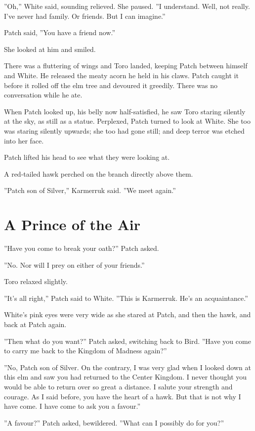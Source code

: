 \documentclass[12pt]{book}
\begin{document}
''Oh,'' White said, sounding relieved. She paused. ''I understand. Well, not really. I've never had family. Or friends. But I can imagine.''

Patch said, ''You have a friend now.''

She looked at him and smiled.

There was a fluttering of wings and Toro landed, keeping Patch between himself and White. He released the meaty acorn he held in his claws. Patch caught it before it rolled off the elm tree and devoured it greedily. There was no conversation while he ate.

When Patch looked up, his belly now half-satisfied, he saw Toro staring silently at the sky, as still as a statue. Perplexed, Patch turned to look at White. She too was staring silently upwards; she too had gone still; and deep terror was etched into her face.

Patch lifted his head to see what they were looking at.

A red-tailed hawk perched on the branch directly above them.

''Patch son of Silver,'' Karmerruk said. ''We meet again.''


\section{A Prince of the Air}

''Have you come to break your oath?'' Patch asked.

''No. Nor will I prey on either of your friends.''

Toro relaxed slightly.

''It's all right,'' Patch said to White. ''This is Karmerruk. He's %
an acquaintance.''

White's pink eyes were very wide as she stared at Patch, and then the hawk, and back at Patch again.

''Then what do you want?'' Patch asked, switching back to Bird. ''Have you come to carry me back to the Kingdom of Madness again?''

''No, Patch son of Silver. On the contrary, I was very glad when I looked down at this elm and saw you had returned to the Center Kingdom. I never thought you would be able to return over so great a distance. I salute your strength and courage. As I said before, you have the heart of a hawk. But that is not why I have come. I have come to ask you a favour.''

''A favour?'' Patch asked, bewildered. ''What can I possibly do for you?''
\end{document}
